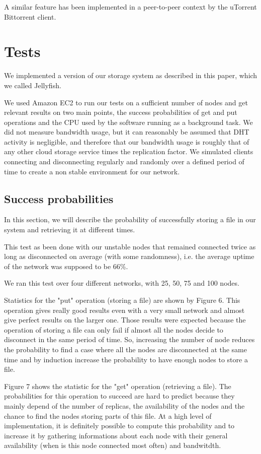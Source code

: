 \documentclass[11pt]{IEEEtran}
\begin{document}
A similar feature has been implemented in a peer-to-peer context by the uTorrent Bittorrent client.

\section{Tests}

We implemented a version of our storage system as described in this paper, which we called Jellyfish.

We used Amazon EC2 to run our tests on a sufficient number of nodes and get relevant results on two main points, the success probabilities of get and put operations and the CPU used by the software running as a background task. We did not measure bandwidth usage, but it can reasonably be assumed that DHT activity is negligible, and therefore that our bandwidth usage is roughly that of any other cloud storage service times the replication factor. We simulated clients connecting and disconnecting regularly and randomly over a defined period of time to create a non stable environment for our network.

\subsection{Success probabilities}

In this section, we will describe the probability of successfully storing a file in our system and retrieving it at different times.

This test as been done with our unstable nodes that remained connected twice as long as disconnected on average (with some randomness), i.e. the average uptime of the network was supposed to be 66\%.

We ran this test over four different networks, with 25, 50, 75 and 100 nodes.

Statistics for the "put" operation (storing a file) are shown by Figure 6. This operation gives really good results even with a very small network and almost give perfect results on the larger one. Those results were expected because the operation of storing a file can only fail if almost all the nodes decide to disconnect in the same period of time. So, increasing the number of node reduces the probability to find a case where all the nodes are disconnected at the same time and by induction increase the probability to have enough nodes to store a file.

Figure 7 shows the statistic for the "get" operation (retrieving a file). The probabilities for this operation to succeed are hard to predict because they mainly depend of the number of replicas, the availability of the nodes and the chance to find the nodes storing parts of this file. At a high level of implementation, it is definitely possible to compute this probability and to increase it by gathering informations about each node with their general availability (when is this node connected most often) and bandwitdth.
\end{document}
